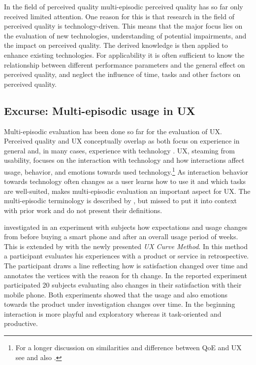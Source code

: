 In the field of perceived quality multi-episodic perceived quality has so far only received limited attention.
One reason for this is that research in the field of perceived quality is technology-driven.
This means that the major focus lies on the evaluation of new technologies, understanding of potential impairments, and the impact on perceived quality.
The derived knowledge is then applied to enhance existing technologies.
For applicability it is often sufficient to know the relationship between different performance parameters and the general effect on perceived quality, and neglect the influence of time, tasks and other factors on perceived quality.

\subsection{Excurse: Multi-episodic usage in \acl{UX}}
Multi-episodic evaluation has been done so far for the evaluation of \acf{UX}.
Perceived quality and \ac{UX} conceptually overlap as both focus on experience in general and, in many cases, experience with technology \citep[cf.][]{book chap 3}.
\ac{UX}, steaming from usability, focuses on the interaction with technology and how interactions affect usage, behavior, and emotions towards used technology.\footnote{For a longer discussion on similarities and difference between \ac{QoE} and \ac{UX} see \cite{book chapter 3} and also \cite{Hasenzahl 2008: towards user experience}.}
As interaction behavior towards technology often changes as a user learns how to use it and which tasks are well-suited, makes multi-episodic evaluation an important aspect for \ac{UX}.
The multi-episodic terminology is described by \citet[p. 8]{roto_user_2011}, but missed to put it into context with prior work and do not present their definitions.

\cite{karapanos_user_2009} investigated in an experiment with \unit[6]{subjects} how expectations and usage changes from before buying a smart phone and after an overall usage period of \unit[4]{weeks}. %
This is extended by \cite{kujala_ux_2011} with the newly presented \emph{UX Curve Method}.
In this method a participant evaluates his experiences with a product or service in retrospective.
The participant draws a line reflecting how is satisfaction changed over time and annotates the vertices with the reason for th change.
In the reported experiment participated 20 subjects evaluating also changes in their satisfaction with their mobile phone.
Both experiments showed that the usage and also emotions towards the product under investigation changes over time.
In the beginning interaction is more playful and exploratory whereas it task-oriented and productive.


